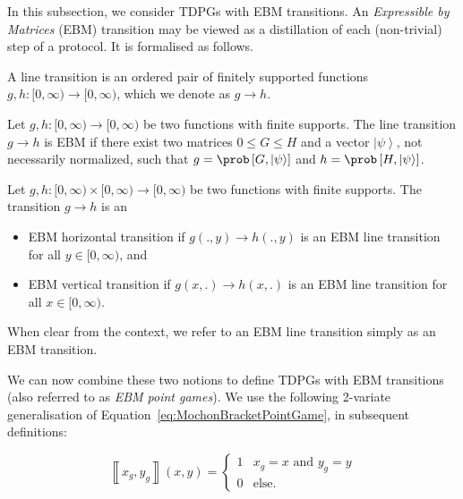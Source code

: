 \documentclass{theoretics}
\begin{document}
In this subsection, we consider TDPGs with EBM transitions. An \emph{Expressible by Matrices} (EBM) transition may be viewed as a distillation of each (non-trivial) step of a protocol. It is formalised as follows.
%

%

\begin{definition}
  A line transition is an ordered pair of finitely supported functions $g,h:[0,\infty)\to[0,\infty)$, which
  we denote as $g\to h$.\label{def:transition}
\end{definition}

\begin{definition}
  Let $g,h:[0,\infty)\to[0,\infty)$ be two functions with finite
  supports. The line transition $g\to h$ is EBM if there exist two matrices $0\le G\le H$ and a vector $\left|\psi\right\rangle $, not necessarily
  normalized, such that $g=\prob\left[G,\left|\psi\right\rangle \right]$
  and $h=\prob\left[H,\left|\psi\right\rangle \right]$.\label{def:EBMlineTransition}
\end{definition}

\begin{definition}
  Let $g,h:[0,\infty)\times[0,\infty)\to[0,\infty)$ be two functions
  with finite supports. The transition $g\to h$ is an
  \begin{itemize}
    \item EBM horizontal transition if $g(.,y)\to h(.,y)$
          is an EBM line transition for all $y\in[0,\infty)$, and
    \item EBM vertical transition if $g(x,.)\to h(x,.)$
          is an EBM line transition for all $x\in[0,\infty)$.
  \end{itemize}
\end{definition}

\begin{remark}
  When clear from the context, we refer to an EBM line transition simply
  as an EBM transition.
\end{remark}
%
We can now combine these two notions to define TDPGs with EBM transitions (also referred to as \emph{EBM point games}). We use the following 2-variate generalisation of Equation~\eqref{eq:MochonBracketPointGame}, in subsequent definitions: %
%
%

%
%
%
%
%
%

\begin{displaymath}
  \left\llbracket x_{g},y_{g}\right\rrbracket (x,y)=\begin{cases}
    1 & x_{g}=x\text{ and }y_{g}=y \\
    0 & \text{else.}
  \end{cases}
\end{displaymath}
\end{document}
